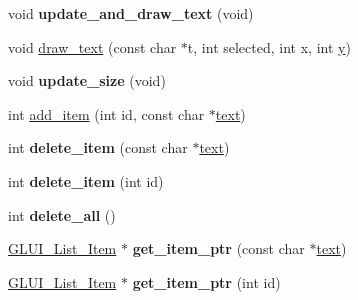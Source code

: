 \begin{DoxyCompactItemize}
\item 
\hypertarget{class_g_l_u_i___list_af83459297185924a6ef9c8ce5618f571}{void {\bfseries update\+\_\+and\+\_\+draw\+\_\+text} (void)}\label{class_g_l_u_i___list_af83459297185924a6ef9c8ce5618f571}

\item 
void \hyperlink{class_g_l_u_i___list_a5ce43d2a245edb348e220f7788f31ab7}{draw\+\_\+text} (const char $\ast$t, int selected, int x, int \hyperlink{_ice_utils_8h_aa7ffaed69623192258fb8679569ff9ba}{y})
\item 
\hypertarget{class_g_l_u_i___list_ab90ecf239cc0deaf4739d636c986d747}{void {\bfseries update\+\_\+size} (void)}\label{class_g_l_u_i___list_ab90ecf239cc0deaf4739d636c986d747}

\item 
int \hyperlink{class_g_l_u_i___list_ac26dc37467a0c3ddb0952f1321c4f703}{add\+\_\+item} (int id, const char $\ast$\hyperlink{class_g_l_u_i___control_af0d60e9736f4dbc34e9a536e75876d72}{text})
\item 
\hypertarget{class_g_l_u_i___list_a2bc8c33e63c775624adf9dfa5b0ffb32}{int {\bfseries delete\+\_\+item} (const char $\ast$\hyperlink{class_g_l_u_i___control_af0d60e9736f4dbc34e9a536e75876d72}{text})}\label{class_g_l_u_i___list_a2bc8c33e63c775624adf9dfa5b0ffb32}

\item 
\hypertarget{class_g_l_u_i___list_a1de769c475c514a2bfccf92552be8dba}{int {\bfseries delete\+\_\+item} (int id)}\label{class_g_l_u_i___list_a1de769c475c514a2bfccf92552be8dba}

\item 
\hypertarget{class_g_l_u_i___list_a68eaa8654adcd307c89e8235a049f4bf}{int {\bfseries delete\+\_\+all} ()}\label{class_g_l_u_i___list_a68eaa8654adcd307c89e8235a049f4bf}

\item 
\hypertarget{class_g_l_u_i___list_a42f0d2ea61b5fe621a4e7e95d4533534}{\hyperlink{class_g_l_u_i___list___item}{G\+L\+U\+I\+\_\+\+List\+\_\+\+Item} $\ast$ {\bfseries get\+\_\+item\+\_\+ptr} (const char $\ast$\hyperlink{class_g_l_u_i___control_af0d60e9736f4dbc34e9a536e75876d72}{text})}\label{class_g_l_u_i___list_a42f0d2ea61b5fe621a4e7e95d4533534}

\item 
\hypertarget{class_g_l_u_i___list_a068577ea0918ed4acb5414e2f8fc42a9}{\hyperlink{class_g_l_u_i___list___item}{G\+L\+U\+I\+\_\+\+List\+\_\+\+Item} $\ast$ {\bfseries get\+\_\+item\+\_\+ptr} (int id)}\label{class_g_l_u_i___list_a068577ea0918ed4acb5414e2f8fc42a9}


\end{DoxyCompactItemize}
